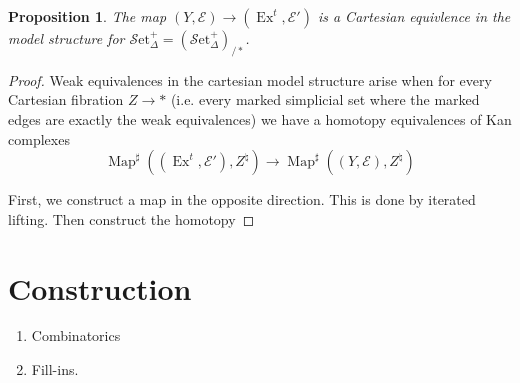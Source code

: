 \documentclass[english]{amsart}
\newcommand{\map}{\operatorname{Map}}
\newcommand{\mc}{\mathcal}
\newcommand{\sset}{\mc{S}\text{et}_\Delta}
\newtheorem*{prop}{Proposition}
\theoremstyle{definition}
\begin{document}
\begin{prop}
The map $(Y,\mc{E}) \to (\operatorname{Ex}^t, \mc{E}')$ is a Cartesian equivlence in the model structure for $\sset^+ = (\sset^+)_{/\ast}$. 
\end{prop}
\begin{proof}
Weak equivalences in the cartesian model structure arise when for every Cartesian fibration $Z \to \ast$ (i.e. every marked simplicial set where the marked edges are exactly the weak equivalences) we have a homotopy equivalences of Kan complexes
\[
\map^\sharp((\operatorname{Ex}^t, \mc{E}'), Z^\natural) \to \map^\sharp ((Y,\mc{E}), Z^\natural)
\]

First, we construct a map in the opposite direction. This is done by iterated lifting. Then construct the homotopy 
\end{proof}

\section{Construction}

\begin{enumerate}
\item Combinatorics

\item Fill-ins. 
\end{enumerate}
\end{document}
